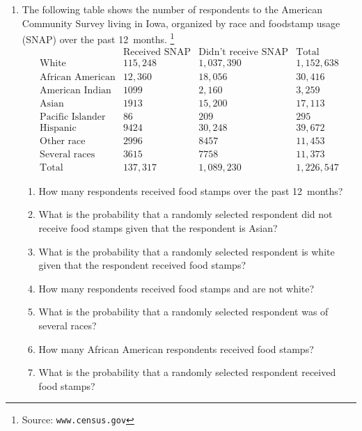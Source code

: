\documentclass[12pt]{article}
\begin{document}
\begin{enumerate}
\item The following table shows the number
of respondents to the American Community
Survey living in Iowa,
organized by race and foodstamp usage (SNAP) over the past 12~months.
\footnote{Source: \tt www.census.gov}
\[\begin{array}{l|rr|r}
&\text{Received SNAP}&\text{Didn't receive SNAP}
&\text{Total}\\\hline
\text{White}&115,248&1,037,390&1,152,638\\
\text{African American}&12,360&18,056&30,416\\
\text{American Indian}&1099&2,160&3,259\\
\text{Asian}&1913&15,200&17,113\\
\text{Pacific Islander}&86&209&295\\
\text{Hispanic}&9424&30,248&39,672\\
\text{Other race}&2996&8457&11,453\\
\text{Several races}&3615&7758&11,373\\\hline
\text{Total}&137,317&1,089,230&1,226,547
\end{array}\]
\begin{enumerate}
\item How many respondents received food stamps over the
past 12~months?
\item What is the probability that a randomly selected
respondent did not receive food stamps given that
the respondent is Asian?
\item What is the probability that a randomly selected
respondent is white given that the respondent
received food stamps?
\item How many respondents received food stamps and
are not white?
\item What is the probability that a randomly selected
respondent was of several races?
\item How many African American respondents received
food stamps?
\item What is the probability that a randomly selected
respondent received food stamps?
\end{enumerate}
\end{enumerate}
\end{document}
